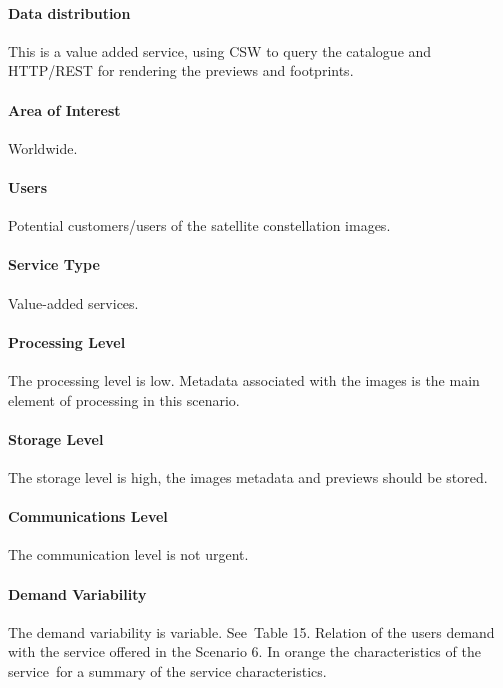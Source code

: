 \documentclass[a4paper]{article}
\begin{document}
\paragraph[Data distribution]{ Data
distribution}
{
This is a value added service, using CSW to query the catalogue and
HTTP/REST for rendering the previews and footprints.}

\paragraph[Area of Interest\ ]{ Area of
Interest\ }
{
Worldwide.}

\paragraph[Users]{ Users}
{
Potential customers/users of the satellite constellation images.}

\paragraph[Service Type]{ Service Type}
{
Value-added services.}

\paragraph[Processing Level]{ Processing Level}
{
The processing level is low. Metadata associated with the images is the
main element of processing in this scenario.}

\paragraph[Storage Level]{ Storage Level}
{
The storage level is high, the images metadata and previews should be
stored.}

\paragraph[Communications Level]{ Communications
Level}
{
The communication level is not urgent.}

\paragraph[Demand Variability]{ Demand
Variability}
\foreignlanguage{english}{The demand variability is variable.
See\ }Table 15. Relation of the users demand with the service offered
in the Scenario 6. In orange the characteristics of the
service\foreignlanguage{english}{\ for a summary of the service
characteristics.}
\end{document}
